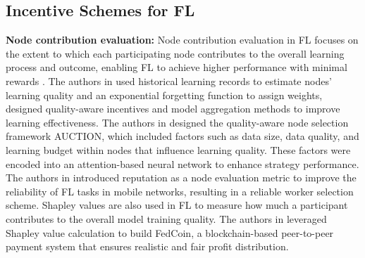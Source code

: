 \subsection{Incentive Schemes for FL}
\textbf{Node contribution evaluation:} Node contribution evaluation in FL focuses on the extent to which each participating node contributes to the overall learning process and outcome, enabling FL to achieve higher performance with minimal rewards \cite{b44}. The authors in \cite{b24} used historical learning records to estimate nodes' learning quality and an exponential forgetting function to assign weights, designed quality-aware incentives and model aggregation methods to improve learning effectiveness. The authors in \cite{b25} designed the quality-aware node selection framework AUCTION, which included factors such as data size, data quality, and learning budget within nodes that influence learning quality. These factors were encoded into an attention-based neural network to enhance strategy performance. The authors in \cite{b26} introduced reputation as a node evaluation metric to improve the reliability of FL tasks in mobile networks, resulting in a reliable worker selection scheme. Shapley values are also used in FL to measure how much a participant contributes to the overall model training quality. The authors in \cite{b27} leveraged Shapley value calculation to build FedCoin, a blockchain-based peer-to-peer payment system that ensures realistic and fair profit distribution.

